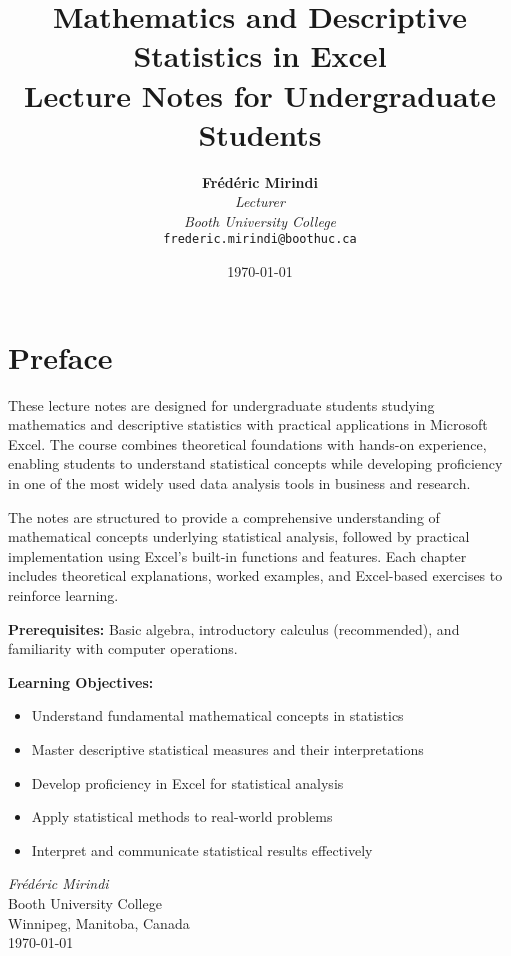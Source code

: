 \documentclass[12pt,a4paper]{book}
\title{\Huge\textbf{Mathematics and Descriptive Statistics in Excel}\\[0.5cm]
       \Large Lecture Notes for Undergraduate Students}
\author{\textbf{Fr\'{e}d\'{e}ric Mirindi}\\[0.3cm]
        \textit{Lecturer}\\[0.2cm]
        \textit{Booth University College}\\[0.5cm]
        \texttt{frederic.mirindi@boothuc.ca}}
\date{\today}
\begin{document}
\maketitle

\tableofcontents
\listoffigures
\listoftables

\chapter*{Preface}

These lecture notes are designed for undergraduate students studying mathematics and descriptive statistics with practical applications in Microsoft Excel. The course combines theoretical foundations with hands-on experience, enabling students to understand statistical concepts while developing proficiency in one of the most widely used data analysis tools in business and research.

The notes are structured to provide a comprehensive understanding of mathematical concepts underlying statistical analysis, followed by practical implementation using Excel's built-in functions and features. Each chapter includes theoretical explanations, worked examples, and Excel-based exercises to reinforce learning.

\textbf{Prerequisites:} Basic algebra, introductory calculus (recommended), and familiarity with computer operations.

\textbf{Learning Objectives:}
\begin{itemize}
    \item Understand fundamental mathematical concepts in statistics
    \item Master descriptive statistical measures and their interpretations
    \item Develop proficiency in Excel for statistical analysis
    \item Apply statistical methods to real-world problems
    \item Interpret and communicate statistical results effectively
\end{itemize}

\vfill
\textit{Fr\'{e}d\'{e}ric Mirindi}\\[0.2cm]
Booth University College\\[0.2cm]
Winnipeg, Manitoba, Canada\\[0.2cm]
\today

\newpage

\end{document}
